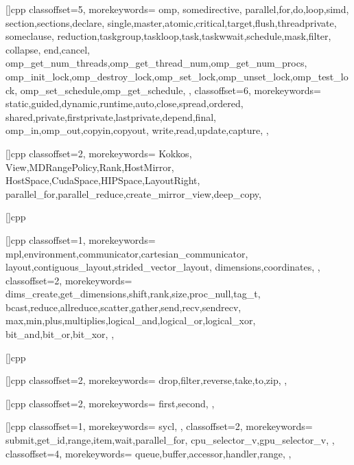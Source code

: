 []{cpp}{
  classoffset=5,
  morekeywords={
    omp,
    somedirective,
    parallel,for,do,loop,simd,
    section,sections,declare,
    single,master,atomic,critical,target,flush,threadprivate,
    someclause,
    reduction,taskgroup,taskloop,task,taskwwait,schedule,mask,filter,
    collapse,
    end,cancel,
    omp_get_num_threads,omp_get_thread_num,omp_get_num_procs,
    omp_init_lock,omp_destroy_lock,omp_set_lock,omp_unset_lock,omp_test_lock,
    omp_set_schedule,omp_get_schedule,
  },
  classoffset=6,
  morekeywords={
    static,guided,dynamic,runtime,auto,close,spread,ordered,
    shared,private,firstprivate,lastprivate,depend,final,
    omp_in,omp_out,copyin,copyout,
    write,read,update,capture,
  },
}


[]{cpp}{
  classoffset=2,
  morekeywords={
    Kokkos,
    View,MDRangePolicy,Rank,HostMirror,
    HostSpace,CudaSpace,HIPSpace,LayoutRight,
    parallel_for,parallel_reduce,create_mirror_view,deep_copy,
  }
}

[]{cpp}{
}

[]{cpp}{
  classoffset=1,
  morekeywords={
    mpl,environment,communicator,cartesian_communicator,
    layout,contiguous_layout,strided_vector_layout,
    dimensions,coordinates,
  },
  classoffset=2,
  morekeywords={
    dims_create,get_dimensions,shift,rank,size,proc_null,tag_t,
    bcast,reduce,allreduce,scatter,gather,send,recv,sendrecv,  
    max,min,plus,multiplies,logical_and,logical_or,logical_xor,
    bit_and,bit_or,bit_xor,
  },
}

[]{cpp}{
}

[]{cpp}{
  classoffset=2,
  morekeywords={
    drop,filter,reverse,take,to,zip,
  },
}

[]{cpp}{
  classoffset=2,
  morekeywords={
    first,second,
  },
}

[]{cpp}{
  classoffset=1,
  morekeywords={
    sycl,
  },
  classoffset=2,
  morekeywords={
    submit,get_id,range,item,wait,parallel_for,
    cpu_selector_v,gpu_selector_v,
  },
  classoffset=4,
  morekeywords={
    queue,buffer,accessor,handler,range,
  },
}

